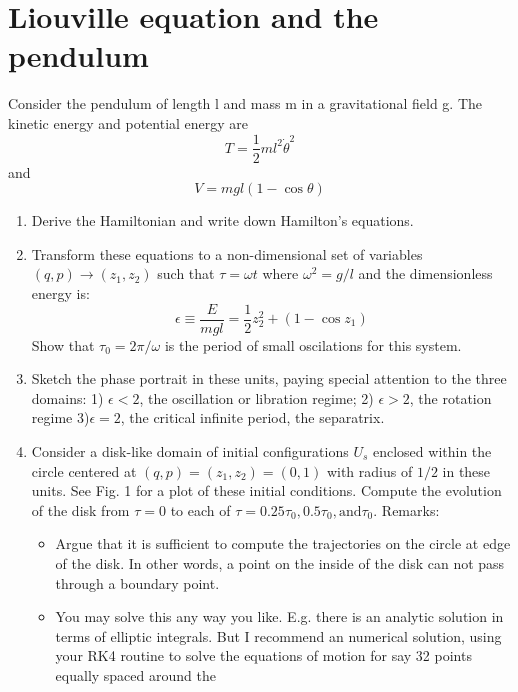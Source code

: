 \section{Liouville equation and the pendulum}

Consider the pendulum of length l and mass m in a gravitational field
g. The kinetic energy and potential energy are
\begin{equation}
    T=\frac{1}{2}ml^2\dot{\theta}^2
\end{equation}
and 
\begin{equation}
    V=mgl(1-\cos\theta)
\end{equation}

\begin{enumerate}

\item Derive the Hamiltonian and write down Hamilton’s equations.
\item Transform these equations to a non-dimensional set of variables $(q,p)\to(z_1,z_2)$ such that $\tau=\omega t$ where $\omega^2=g/l$ and the dimensionless energy is:
\begin{equation}
    \epsilon\equiv\frac{E}{mgl}=\frac{1}{2}z_2^2+(1-\cos z_1)
\end{equation}
Show that $\tau_0=2\pi/\omega$ is the period of small oscilations  for this system.
\item Sketch the phase portrait in these units, paying special attention to
the three domains: 1) $\epsilon<2$, the oscillation  or libration regime; 2) $\epsilon>2$, the rotation regime 3)$\epsilon=2$, the critical infinite period, the separatrix.
\item Consider a disk-like domain of initial configurations $U_s$ enclosed
within the circle centered at $(q,p)=(z_1,z_2)=(0,1)$ with radius
of $1/2$ in these units. See Fig. 1 for a plot of these initial conditions. Compute the evolution of the disk from $\tau=0$ to each of $\tau=0.25\tau_0,0.5\tau_0,\mathrm{and}\tau_0$.
Remarks:
    \begin{itemize}
    \item Argue that it is sufficient to compute the trajectories on the
    circle at edge of the disk. In other words, a point on the inside
    of the disk can not pass through a boundary point.
    \item You may solve this any way you like. E.g. there is an analytic
    solution in terms of elliptic integrals. But I recommend an
    numerical solution, using your RK4 routine to solve the equations of motion for say 32 points equally spaced around the

\end{itemize}
\end{enumerate}
